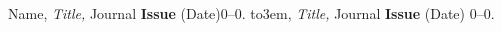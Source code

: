 {\def\bysame{\leavevmode\hbox to3em{\hrulefill}\thinspace}\newcommand{\NUMBERRRR}{\#}\newcommand{\PAGESS}{}
\begin{thebibliography}{99}
 Name, \emph{Title,} Journal {\bf Issue} (Date)\PAGESS{}0--0.
 \bysame, \emph{Title,} Journal {\bf Issue} (Date) \PAGESS{}0--0.
\end{thebibliography}}